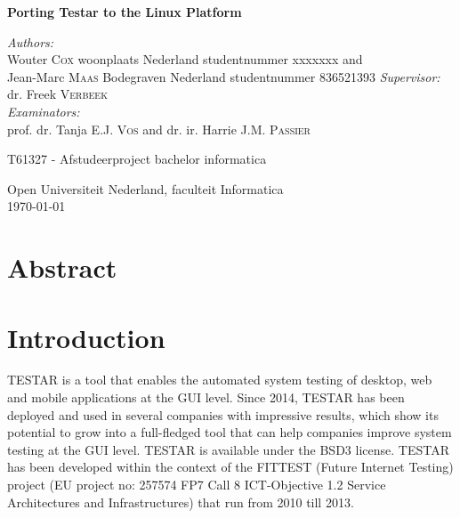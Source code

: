 \documentclass[11pt,twocolumn]{article}
\begin{document}
\begin{titlepage}
    \begin{center}
        \vspace*{1cm}
        
       {\large \bfseries{Porting Testar to the Linux Platform}\par}\vspace{0.4cm} %
      
        
        \vspace{0.5cm}
        
        
        \vspace{1.5cm}
        \emph{Authors:}\\
        {Wouter \textsc{Cox} woonplaats Nederland studentnummer xxxxxxx} and\\ {Jean-Marc \textsc{Maas} Bodegraven Nederland studentnummer 836521393}
        \vfill
        \emph{Supervisor:} \\
        dr. Freek \textsc{Verbeek}\\
        \vspace{0.5cm}
        \emph{Examinators:}\\ 
        {prof. dr. Tanja E.J. \textsc{Vos} and dr. ir. Harrie J.M. \textsc{Passier}}
        \vfill
        
        T61327 - Afstudeerproject bachelor informatica
     
        
        \vspace{0.8cm}
        
      
        
  
        Open Universiteit Nederland, faculteit Informatica\\
        {\large \today}\\[4cm] %
        
    \end{center}
\end{titlepage}

\section{Abstract}

\section{Introduction}
TESTAR is a tool that enables the automated system testing of desktop, web and mobile applications at the \gls{GUI} level.
Since 2014, TESTAR has been deployed and used in several companies with impressive results, which show its potential to grow into a full-fledged tool that can help companies improve system testing at the GUI level.
TESTAR is available under the \gls{BSD3} license.
TESTAR has been developed within the context of the FITTEST (Future Internet Testing) project (EU project no: 257574 FP7 Call 8 ICT-Objective 1.2 Service Architectures and Infrastructures) that run from 2010 till 2013.
\end{document}
